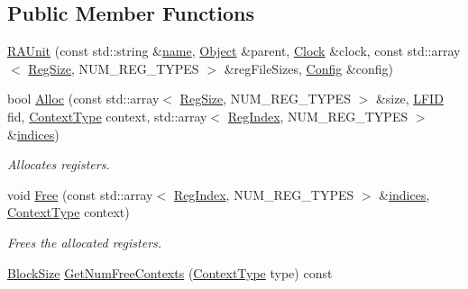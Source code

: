 \subsection*{Public Member Functions}
\begin{DoxyCompactItemize}
\item 
\hyperlink{class_simulator_1_1drisc_1_1_r_a_unit_a124f0250c01c5c02c5a15b6b3e14b5d9}{R\+A\+Unit} (const std\+::string \&\hyperlink{mtconf_8c_a8f8f80d37794cde9472343e4487ba3eb}{name}, \hyperlink{class_simulator_1_1_object}{Object} \&parent, \hyperlink{class_simulator_1_1_clock}{Clock} \&clock, const std\+::array$<$ \hyperlink{namespace_simulator_a7c5ca3b196c951c92b8159e54e76075f}{Reg\+Size}, N\+U\+M\+\_\+\+R\+E\+G\+\_\+\+T\+Y\+P\+E\+S $>$ \&reg\+File\+Sizes, \hyperlink{class_config}{Config} \&config)
\item 
bool \hyperlink{class_simulator_1_1drisc_1_1_r_a_unit_a3487a99ce34f5f8144a6b64dcb5129a8}{Alloc} (const std\+::array$<$ \hyperlink{namespace_simulator_a7c5ca3b196c951c92b8159e54e76075f}{Reg\+Size}, N\+U\+M\+\_\+\+R\+E\+G\+\_\+\+T\+Y\+P\+E\+S $>$ \&size, \hyperlink{namespace_simulator_aaccbc706b2d6c99085f52f6dfc2333e4}{L\+F\+I\+D} fid, \hyperlink{namespace_simulator_ab3233bd11b43e37322a8111dc7eec133}{Context\+Type} context, std\+::array$<$ \hyperlink{namespace_simulator_ab00c9033de4c9a17db7b53d6c292515c}{Reg\+Index}, N\+U\+M\+\_\+\+R\+E\+G\+\_\+\+T\+Y\+P\+E\+S $>$ \&\hyperlink{breaknegindex_8c_a885a361f3b999997d4942f3554ee311a}{indices})
\begin{DoxyCompactList}\small\item\em Allocates registers. \end{DoxyCompactList}\item 
void \hyperlink{class_simulator_1_1drisc_1_1_r_a_unit_aaedc9069d7a19cab490e53263a5d3ccf}{Free} (const std\+::array$<$ \hyperlink{namespace_simulator_ab00c9033de4c9a17db7b53d6c292515c}{Reg\+Index}, N\+U\+M\+\_\+\+R\+E\+G\+\_\+\+T\+Y\+P\+E\+S $>$ \&\hyperlink{breaknegindex_8c_a885a361f3b999997d4942f3554ee311a}{indices}, \hyperlink{namespace_simulator_ab3233bd11b43e37322a8111dc7eec133}{Context\+Type} context)
\begin{DoxyCompactList}\small\item\em Frees the allocated registers. \end{DoxyCompactList}\item 
\hyperlink{class_simulator_1_1drisc_1_1_r_a_unit_aa5b30133d4961a3b8e06e4fda505ea3d}{Block\+Size} \hyperlink{class_simulator_1_1drisc_1_1_r_a_unit_ac96c53a78ddfdd1d5e78911d982055a8}{Get\+Num\+Free\+Contexts} (\hyperlink{namespace_simulator_ab3233bd11b43e37322a8111dc7eec133}{Context\+Type} type) const 

\end{DoxyCompactItemize}
